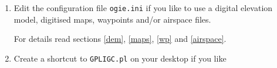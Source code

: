 \begin{enumerate}



\item Edit the configuration file \texttt{ogie.ini} if you like to use a digital
elevation model, digitised maps, waypoints and/or airspace files.

For details read sections \ref{dem}, \ref{maps}, \ref{wp} and \ref{airspace}.

\item Create a shortcut to \texttt{GPLIGC.pl} on your desktop if you like

\end{enumerate}





